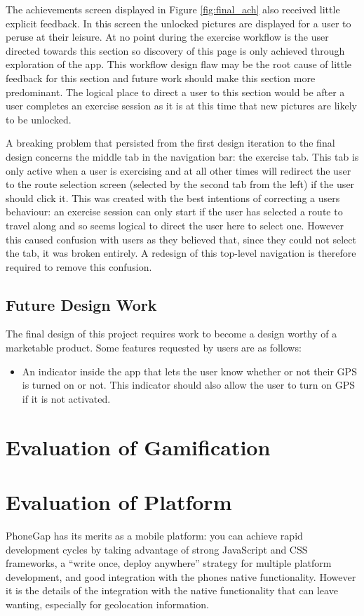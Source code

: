 The achievements screen displayed in Figure \ref{fig:final_ach} also
received little explicit feedback. In this screen the unlocked
pictures are displayed for a user to peruse at their leisure. At no
point during the exercise workflow is the user directed towards this
section so discovery of this page is only achieved through exploration
of the app. This workflow design flaw may be the root cause of little
feedback for this section and future work should make this section
more predominant. The logical place to direct a user to this section
would be after a user completes an exercise session as it is at this
time that new pictures are likely to be unlocked. 

A breaking problem that persisted from the first design iteration to
the final design concerns the middle tab in the navigation bar: the
exercise tab. This tab is only active when a user is exercising and at
all other times will redirect the user to the route selection screen
(selected by the second tab from the left) if the user should click
it. This was created with the best intentions of correcting a users
behaviour: an exercise session can only start if the user has selected
a route to travel along and so seems logical to direct the user here
to select one. However this caused confusion with users as they
believed that, since they could not select the tab, it was broken
entirely. A redesign of this top-level navigation is therefore
required to remove this confusion.

\subsection{Future Design Work}
The final design of this project requires work to become a design
worthy of a marketable product. Some features requested by users are
as follows:

\begin{itemize}
  \item An indicator inside the app that lets the user know whether or
    not their GPS is turned on or not. This indicator should also
    allow the user to turn on GPS if it is not activated.
\end{itemize}



\section{Evaluation of Gamification}

\section{Evaluation of Platform}
PhoneGap has its merits as a mobile platform: you can achieve rapid
development cycles by taking advantage of strong JavaScript and CSS
frameworks, a ``write once, deploy anywhere'' strategy for multiple
platform development, and good integration with the phones native
functionality. However it is the details of the integration with the
native functionality that can leave wanting, especially for
geolocation information.

